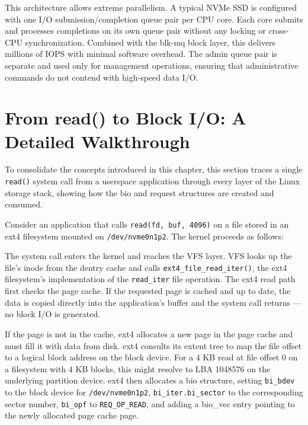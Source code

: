 This architecture allows extreme parallelism. A typical NVMe SSD is configured with one I/O submission/completion queue pair per CPU core. Each core submits and processes completions on its own queue pair without any locking or cross-CPU synchronization. Combined with the blk-mq block layer, this delivers millions of IOPS with minimal software overhead. The admin queue pair is separate and used only for management operations, ensuring that administrative commands do not contend with high-speed data I/O.

\section{From read() to Block I/O: A Detailed Walkthrough}
\label{sec:read-to-bio}

To consolidate the concepts introduced in this chapter, this section traces a single \texttt{read()} system call from a userspace application through every layer of the Linux storage stack, showing how the bio and request structures are created and consumed.

Consider an application that calls \texttt{read(fd, buf, 4096)} on a file stored in an ext4 filesystem mounted on \texttt{/dev/nvme0n1p2}. The kernel proceeds as follows:

The system call enters the kernel and reaches the VFS layer. VFS looks up the file's inode from the dentry cache and calls \texttt{ext4\_file\_read\_iter()}, the ext4 filesystem's implementation of the \texttt{read\_iter} file operation. The ext4 read path first checks the page cache. If the requested page is cached and up to date, the data is copied directly into the application's buffer and the system call returns --- no block I/O is generated.

If the page is not in the cache, ext4 allocates a new page in the page cache and must fill it with data from disk. ext4 consults its extent tree to map the file offset to a logical block address on the block device. For a 4 KB read at file offset 0 on a filesystem with 4 KB blocks, this might resolve to LBA 1048576 on the underlying partition device. ext4 then allocates a bio structure, setting \texttt{bi\_bdev} to the block device for \texttt{/dev/nvme0n1p2}, \texttt{bi\_iter.bi\_sector} to the corresponding sector number, \texttt{bi\_opf} to \texttt{REQ\_OP\_READ}, and adding a bio\_vec entry pointing to the newly allocated page cache page.

